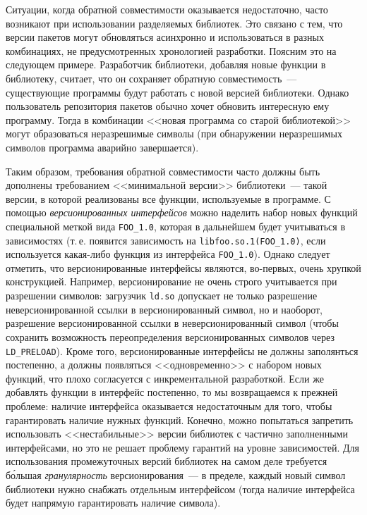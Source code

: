 \documentclass[russian,a4paper,12pt,titlepage]{article}
\begin{document}
Ситуации, когда обратной совместимости оказывается недостаточно, часто возникают при использовании разделяемых
библиотек.  Это связано с тем, что версии пакетов могут обновляться асинхронно и использоваться в разных комбинациях,
не предусмотренных хронологией разработки.  Поясним это на следующем примере.  Разработчик библиотеки, добавляя новые функции в библиотеку,
считает, что он сохраняет обратную совместимость~--- существующие программы будут работать с новой версией библиотеки.
Однако пользователь репозитория пакетов обычно хочет обновить интересную ему программу.  Тогда в комбинации <<новая программа
со старой библиотекой>> могут образоваться неразрешимые символы (при обнаружении неразрешимых символов программа аварийно завершается).

Таким образом, требования обратной совместимости часто должны быть дополнены требованием <<минимальной версии>> библиотеки~---
такой версии, в которой реализованы все функции, используемые в программе.  С помощью \emph{версионированных интерфейсов}
можно наделить набор новых функций специальной меткой вида \verb|FOO_1.0|, которая в дальнейшем будет учитываться в зависимостях
(т.\,е. появится зависимость на \verb|libfoo.so.1(FOO_1.0)|, если используется какая-либо функция из интерфейса \verb|FOO_1.0|).
Однако следует отметить, что версионированные интерфейсы являются, во-первых, очень хрупкой конструкцией.
Например, версионирование не очень строго учитывается при разрешении символов: загрузчик \verb|ld.so| допускает не только
разрешение неверсионированной ссылки в версионированный символ, но и наоборот, разрешение версионированной ссылки в неверсионированный
символ (чтобы сохранить возможность переопределения версионированных символов через \verb|LD_PRELOAD|).  Кроме того,
версионированные интерфейсы не должны заполянться постепенно, а должны появляться <<одновременно>> с набором новых функций,
что плохо согласуется с инкрементальной разработкой.  Если же добавлять функции в интерфейс постепенно, то мы возвращаемся
к прежней проблеме: наличие интерфейса оказывается недостаточным для того, чтобы гарантировать наличие нужных функций.
Конечно, можно попытаться запретить использовать <<нестабильные>> версии библиотек с частично заполненными интерфейсами,
но это не решает проблему гарантий на уровне зависимостей.  Для использования промежуточных версий библиотек на самом деле
требуется б\'{о}льшая \emph{гранулярность} версионирования~--- в пределе, каждый новый символ библиотеки нужно снабжать
отдельным интерфейсом (тогда наличие интерфейса будет напрямую гарантировать наличие символа).
\end{document}
